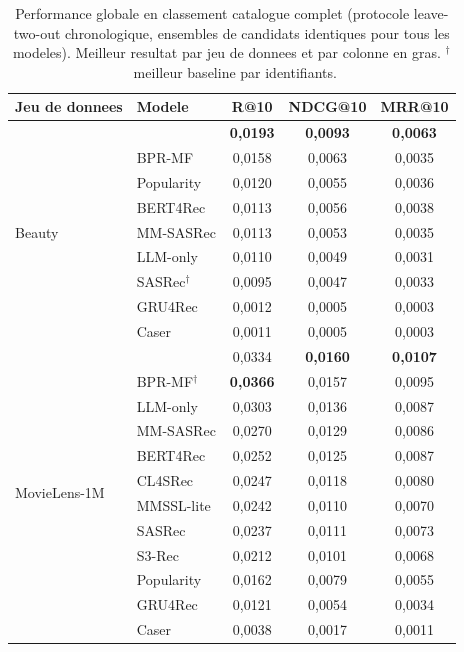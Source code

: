 \begin{table}[t]
\centering
\caption{Performance globale en classement catalogue complet (protocole
leave-two-out chronologique, ensembles de candidats identiques pour tous les
modeles). Meilleur resultat par jeu de donnees et par colonne en gras.
$^\dagger$~meilleur baseline par identifiants.}
\label{tab:overall}
\small
\begin{tabular}{llccc}
\toprule
\textbf{Jeu de donnees} & \textbf{Modele} & \textbf{R@10} & \textbf{NDCG@10} & \textbf{MRR@10} \\
\midrule
\multirow{9}{*}{Beauty}
 & \textbf{\model{}}    & \textbf{0,0193} & \textbf{0,0093} & \textbf{0,0063} \\
 & BPR-MF               & 0,0158 & 0,0063 & 0,0035 \\
 & Popularity           & 0,0120 & 0,0055 & 0,0036 \\
 & BERT4Rec             & 0,0113 & 0,0056 & 0,0038 \\
 & MM-SASRec            & 0,0113 & 0,0053 & 0,0035 \\
 & LLM-only             & 0,0110 & 0,0049 & 0,0031 \\
 & SASRec$^\dagger$     & 0,0095 & 0,0047 & 0,0033 \\
 & GRU4Rec              & 0,0012 & 0,0005 & 0,0003 \\
 & Caser                & 0,0011 & 0,0005 & 0,0003 \\
\midrule
\multirow{12}{*}{MovieLens-1M}
 & \textbf{\model{}}    & 0,0334 & \textbf{0,0160} & \textbf{0,0107} \\
 & BPR-MF$^\dagger$     & \textbf{0,0366} & 0,0157 & 0,0095 \\
 & LLM-only             & 0,0303 & 0,0136 & 0,0087 \\
 & MM-SASRec            & 0,0270 & 0,0129 & 0,0086 \\
 & BERT4Rec             & 0,0252 & 0,0125 & 0,0087 \\
 & CL4SRec              & 0,0247 & 0,0118 & 0,0080 \\
 & MMSSL-lite           & 0,0242 & 0,0110 & 0,0070 \\
 & SASRec               & 0,0237 & 0,0111 & 0,0073 \\
 & S3-Rec               & 0,0212 & 0,0101 & 0,0068 \\
 & Popularity           & 0,0162 & 0,0079 & 0,0055 \\
 & GRU4Rec              & 0,0121 & 0,0054 & 0,0034 \\
 & Caser                & 0,0038 & 0,0017 & 0,0011 \\
\bottomrule
\end{tabular}
\end{table}

